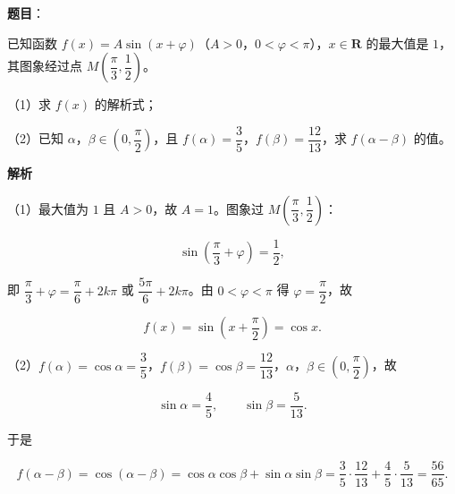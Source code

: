 \begin{answer}

\textbf{题目}：

已知函数 $f(x)=A\sin(x+\varphi)$（$A>0$，$0<\varphi<\pi$），$x\in\mathbf R$ 的最大值是 $1$，其图象经过点 $M\left(\dfrac{\pi}{3},\dfrac12\right)$。

（1）求 $f(x)$ 的解析式；

（2）已知 $\alpha$，$\beta\in\left(0,\dfrac{\pi}{2}\right)$，且 $f(\alpha)=\dfrac35$，$f(\beta)=\dfrac{12}{13}$，求 $f(\alpha-\beta)$ 的值。

\textbf{解析}

（1）最大值为 $1$ 且 $A>0$，故 $A=1$。图象过 $M\left(\dfrac{\pi}3,\dfrac12\right)$：

\nopagebreak[4]
\[\sin\left(\frac{\pi}3+\varphi\right)=\frac12,\]

即 $\dfrac{\pi}3+\varphi=\dfrac{\pi}6+2k\pi$ 或 $\dfrac{5\pi}6+2k\pi$。由 $0<\varphi<\pi$ 得 $\varphi=\dfrac{\pi}2$，故

\nopagebreak[4]
\[f(x)=\sin\left(x+\frac{\pi}2\right)=\cos x.\]

（2）$f(\alpha)=\cos\alpha=\dfrac35$，$f(\beta)=\cos\beta=\dfrac{12}{13}$，$\alpha$，$\beta\in\left(0,\dfrac{\pi}2\right)$，故

\nopagebreak[4]
\[\sin\alpha=\frac45,\qquad \sin\beta=\frac5{13}.\]

于是

\nopagebreak[4]
\[f(\alpha-\beta)=\cos(\alpha-\beta)=\cos\alpha\cos\beta+\sin\alpha\sin\beta=\frac35\cdot\frac{12}{13}+\frac45\cdot\frac5{13}=\frac{56}{65}.\]


\end{answer}
